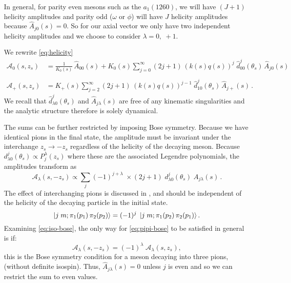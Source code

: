 In general, for parity even mesons such as the \(a_1(1260)\), we will have \((J +1)\) helicity amplitudes and parity odd (\(\omega \text{ or } \phi\)) will have \(J\) helicity amplitudes because \(\hat{A}_{j0}(s) = 0\). So for our axial vector we only have two independent helicity amplitudes and we choose to consider \(\lambda = 0,\; +1\).

We rewrite \cref{eq:helicity}
  \begin{align}
    \label{eq:model-helicity-zero}
    \mathcal{A}_0(s,z_s) &= \frac{1}{K_{0}(s)} \, \hat{A}_{00}(s) + K_{0}(s) \sum_{j = 0}^\infty (2j+1) \, (k(s)q(s))^j \; \hat{d}_{00}^j(\theta_s) \, \hat{A}_{j0}(s) \\
    \nonumber \\
    \label{eq:model-helicity-plus}
    \mathcal{A}_+(s,z_s) &=  K_{+}(s) \sum_{j = 2}^\infty (2j+1) \ (k(s)q(s))^{j-1} \;  \hat{d}_{10}^j(\theta_s) \, \hat{A}_{j+}(s) \,.
   \end{align}
We recall that \(\hat{d}^j_{\lambda 0}(\theta_s)\) and \(\hat{A}_{j\lambda}(s)\) are free of any kinematic singularities and the analytic structure therefore is solely dynamical.

The sums can be further restricted by imposing Bose symmetry. Because we have identical pions in the final state, the amplitude must be invariant under the interchange \(z_s \to -z_s\) regardless of the helicity of the decaying meson.
Because \(d^j_{\lambda0}(\theta_s) \propto P^\lambda_j(z_s)\) where these are the associated Legendre polynomials, the amplitudes transform as
  \begin{equation}
    \label{eq:iso-bose}
   \mathcal{A}_{\lambda}(s, -z_s) \propto \sum_{j} (-1)^{j+\lambda} \; \times (2j+1) \;  d^j_{\lambda0}(\theta_s) \; A_{j\lambda}(s) \,.
  \end{equation}
The effect of interchanging pions is discussed in \cite{JACOB1959404}, and should be independent of the helicity of the decaying particle in the initial state.
  \begin{equation}
    \label{eq:pipi-bose}
    \ket{j \; m ; \pi_1(p_1) \, \pi_2(p_2)} = (-1)^j \; \ket{j \; m; \pi_1(p_2) \, \pi_2(p_1)}.
  \end{equation}
Examining \cref{eq:iso-bose}, the only way for \cref{eq:pipi-bose} to be satisfied in general is if:
  \begin{equation}
    \label{eq:helicity-bose}
    \mathcal{A}_{\lambda}(s,-z_s) = (-1)^\lambda \; \mathcal{A}_{\lambda}(s, z_s),
  \end{equation}
this is the Bose symmetry condition for a meson decaying into three pions, (without definite isospin).
Thus, \(\hat{A}_{j\lambda}(s) = 0\) unless \(j\) is even and so we can restrict the sum to even values.

